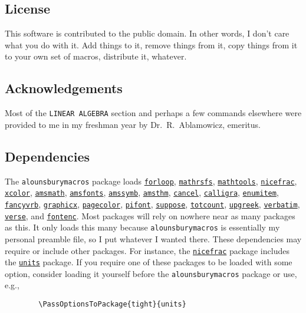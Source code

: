 \documentclass[12pt]{article}
\begin{document}
    \subsection{License}
    This software is contributed to the public domain. In other words, I don't care what you do with it. Add things to it, remove things from it, copy things from it to your own set of macros, distribute it, whatever. 

    \subsection{Acknowledgements}
    Most of the \texttt{LINEAR ALGEBRA} section and perhaps a few commands elsewhere were provided to me in my freshman year by Dr.\ R.\ Ablamowicz, emeritus. 

    \subsection{Dependencies}
    The \texttt{alounsburymacros} package loads 
    \href{https://ctan.org/pkg/forloop}{\texttt{forloop}}, 
    \href{https://ctan.org/pkg/mathrsfs}{\texttt{mathrsfs}}, 
    \href{https://ctan.org/pkg/mathtools}{\texttt{mathtools}}, 
    \href{https://ctan.org/pkg/nicefrac}{\texttt{nicefrac}}, 
    \href{https://ctan.org/pkg/xcolor}{\texttt{xcolor}}, 
    \href{https://ctan.org/pkg/amsmath}{\texttt{amsmath}}, 
    \href{https://ctan.org/pkg/amsfonts}{\texttt{amsfonts}}, 
    \href{https://ctan.org/pkg/amsfonts}{\texttt{amssymb}}, 
    \href{https://ctan.org/pkg/amsthm}{\texttt{amsthm}}, 
    \href{https://ctan.org/pkg/cancel}{\texttt{cancel}}, 
    \href{https://ctan.org/pkg/calligra}{\texttt{calligra}}, 
    \href{https://ctan.org/pkg/enumitem}{\texttt{enumitem}}, 
    \href{https://ctan.org/pkg/fancyvrb}{\texttt{fancyvrb}}, 
    \href{https://ctan.org/pkg/graphicx}{\texttt{graphicx}}, 
    \href{https://ctan.org/pkg/pagecolor}{\texttt{pagecolor}},  
    \href{https://ctan.org/pkg/pifont}{\texttt{pifont}},  
    \href{https://ctan.org/pkg/suppose}{\texttt{suppose}},  
    \href{https://ctan.org/pkg/totcount}{\texttt{totcount}},  
    \href{https://ctan.org/pkg/upgreek}{\texttt{upgreek}},  
    \href{https://ctan.org/pkg/verbatim}{\texttt{verbatim}},  
    \href{https://ctan.org/pkg/verse}{\texttt{verse}}, and 
    \href{https://ctan.org/pkg/fontenc}{\texttt{fontenc}}.
    Most packages will rely on nowhere near as many packages as this. It only loads this many because \texttt{alounsburymacros} is essentially my personal preamble file, so I put whatever I wanted there. \p
    These dependencies may require or include other packages. For instance, the \href{https://ctan.org/pkg/nicefrac}{\texttt{nicefrac}} package includes the \href{https://ctan.org/pkg/units}{\texttt{units}} package. If you require one of these packages to be loaded with some option, consider loading it yourself before the \texttt{alounsburymacros} package or use, e.g., 
    \begin{Verbatim}
        \PassOptionsToPackage{tight}{units}
    \end{Verbatim}
\end{document}
